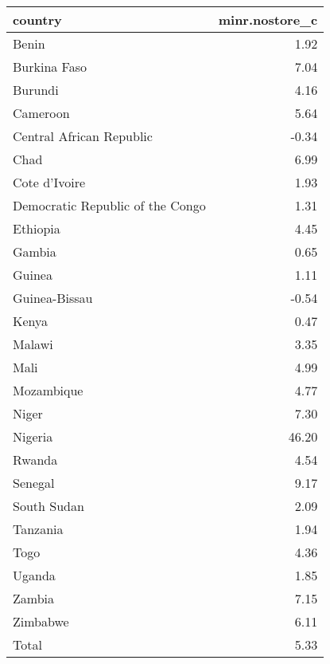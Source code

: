 \begin{table}[ht]
\centering
\begin{tabular}{lr}
  \hline
country & minr.nostore\_c \\ 
  \hline
Benin & 1.92 \\ 
  Burkina Faso & 7.04 \\ 
  Burundi & 4.16 \\ 
  Cameroon & 5.64 \\ 
  Central African Republic & -0.34 \\ 
  Chad & 6.99 \\ 
  Cote d'Ivoire & 1.93 \\ 
  Democratic Republic of the Congo & 1.31 \\ 
  Ethiopia & 4.45 \\ 
  Gambia & 0.65 \\ 
  Guinea & 1.11 \\ 
  Guinea-Bissau & -0.54 \\ 
  Kenya & 0.47 \\ 
  Malawi & 3.35 \\ 
  Mali & 4.99 \\ 
  Mozambique & 4.77 \\ 
  Niger & 7.30 \\ 
  Nigeria & 46.20 \\ 
  Rwanda & 4.54 \\ 
  Senegal & 9.17 \\ 
  South Sudan & 2.09 \\ 
  Tanzania & 1.94 \\ 
  Togo & 4.36 \\ 
  Uganda & 1.85 \\ 
  Zambia & 7.15 \\ 
  Zimbabwe & 6.11 \\ 
  Total & 5.33 \\ 
   \hline
\end{tabular}
\end{table}
